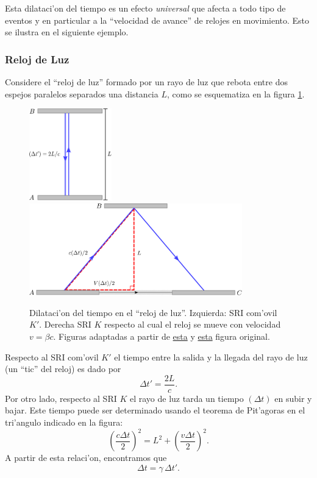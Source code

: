 Esta dilataci'on del tiempo es un efecto \textit{universal} que afecta a todo tipo de eventos y en particular a la ``velocidad de avance'' de relojes en movimiento. Esto se ilustra en el siguiente ejemplo.

\subsubsection{Reloj de Luz}
Considere el ``reloj de luz'' formado por un rayo de luz que rebota entre dos espejos paralelos separados una distancia $L$, como se esquematiza en la figura \ref{dt}.
\begin{figure}[!h]
\centerline{\includegraphics[height= 4cm]{fig/fig-diagrama-dilatacion-01.pdf}\hspace{1cm}
\includegraphics[height=4cm]{fig/fig-diagrama-dilatacion-02.pdf}}
 \caption{Dilataci'on del tiempo en el ``reloj de luz''. Izquierda: SRI com'ovil $K'$. Derecha SRI $K$ respecto al cual el reloj se mueve con velocidad $v=\beta c$. Figuras adaptadas a partir de \href{http://en.wikipedia.org/wiki/File:Time-dilation-001.svg}{esta} y \href{http://en.wikipedia.org/wiki/File:Time-dilation-002.svg}{esta} figura original.}
\label{dt}
\end{figure}
Respecto al SRI com'ovil $K'$ el tiempo entre la salida y la llegada del rayo de luz (un ``tic'' del reloj) es dado por
\begin{equation}
\Delta t'=\frac{2L}{c}.
\end{equation}
Por otro lado, respecto al SRI $K$ el rayo de luz tarda un tiempo $(\Delta t)$ en subir y bajar. Este tiempo puede ser determinado usando el teorema de Pit'agoras en el tri'angulo indicado en la figura:	
\begin{equation}
\left(\frac{c\Delta t}{2}\right)^2=L^2+\left(\frac{v\Delta t}{2}\right)^2.
\end{equation}
A partir de esta relaci'on, encontramos que
\begin{equation}
\Delta t=\gamma\,\Delta t'.
\end{equation}


